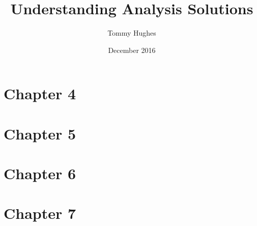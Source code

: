 \documentclass{report}
\title{Understanding Analysis Solutions}
\author{Tommy Hughes}
\date{December 2016}
\begin{document}
\maketitle

\chapter*{Chapter 4}





\chapter*{Chapter 5}



\chapter*{Chapter 6}




\chapter*{Chapter 7}



\end{document}
